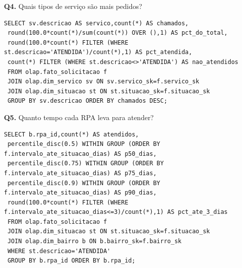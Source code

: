 \documentclass[12pt,a4paper]{article}
\begin{document}
\noindent\begin{minipage}{\textwidth}
\small\textbf{Q4.} Quais tipos de serviço são mais pedidos?\par\vspace{2pt}
\begin{lstlisting}
SELECT sv.descricao AS servico,count(*) AS chamados,
 round(100.0*count(*)/sum(count(*)) OVER (),1) AS pct_do_total,
 round(100.0*count(*) FILTER (WHERE st.descricao='ATENDIDA')/count(*),1) AS pct_atendida,
 count(*) FILTER (WHERE st.descricao<>'ATENDIDA') AS nao_atendidos
 FROM olap.fato_solicitacao f
 JOIN olap.dim_servico sv ON sv.servico_sk=f.servico_sk
 JOIN olap.dim_situacao st ON st.situacao_sk=f.situacao_sk
 GROUP BY sv.descricao ORDER BY chamados DESC;
\end{lstlisting}
\end{minipage}\par\vspace{8pt}
\noindent\begin{minipage}{\textwidth}
\small\textbf{Q5.} Quanto tempo cada RPA leva para atender?\par\vspace{2pt}
\begin{lstlisting}
SELECT b.rpa_id,count(*) AS atendidos,
 percentile_disc(0.5) WITHIN GROUP (ORDER BY f.intervalo_ate_situacao_dias) AS p50_dias,
 percentile_disc(0.75) WITHIN GROUP (ORDER BY f.intervalo_ate_situacao_dias) AS p75_dias,
 percentile_disc(0.9) WITHIN GROUP (ORDER BY f.intervalo_ate_situacao_dias) AS p90_dias,
 round(100.0*count(*) FILTER (WHERE f.intervalo_ate_situacao_dias<=3)/count(*),1) AS pct_ate_3_dias
 FROM olap.fato_solicitacao f
 JOIN olap.dim_situacao st ON st.situacao_sk=f.situacao_sk
 JOIN olap.dim_bairro b ON b.bairro_sk=f.bairro_sk
 WHERE st.descricao='ATENDIDA'
 GROUP BY b.rpa_id ORDER BY b.rpa_id;
\end{lstlisting}
\end{minipage}\par\vspace{8pt}
\end{document}

